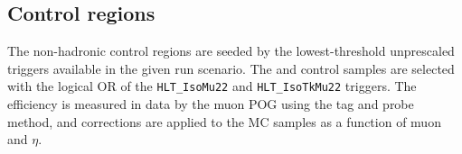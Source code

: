 



\subsection{Control regions\label{sec:control_samples}}




The non-hadronic control regions are seeded by the lowest-threshold unprescaled 
triggers available in the given run scenario. The 
\mj and \mmj control samples are selected with the logical OR of the \verb!HLT_IsoMu22!
and \verb!HLT_IsoTkMu22! triggers.
The efficiency is measured in data by the muon POG using the tag and probe method,
and corrections are applied to the MC samples as a function of muon \Pt and $\eta$.

